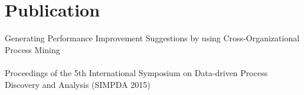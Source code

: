 \section{Publication}
\sectionspace %
Generating Performance Improvement Suggestions by using Cross-Organizational Process Mining \\
 \\
Proceedings of the 5th International Symposium on Data-driven Process Discovery and Analysis (SIMPDA 2015) \\
